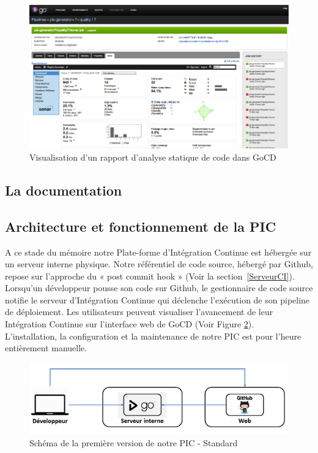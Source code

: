      \begin{figure}
        \begin{center}
          \includegraphics[scale=0.7]{images/GoCDSonar.png}
        \end{center}
        \caption{Visualisation d'un rapport d'analyse statique de code dans GoCD}
        \label{GoCDSonar}
      \end{figure}

      \subsection{La documentation}

      \subsection{Architecture et fonctionnement de la PIC}
      A ce stade du mémoire notre Plate-forme d'Intégration Continue est hébergée sur un serveur interne physique. Notre référentiel de code source, hébergé par Github, repose sur l'approche du « post commit hook » (Voir la section~\ref{ServeurCI}). Lorsqu'un développeur pousse son code sur Github, le gestionnaire de code source notifie le serveur d'Intégration Continue qui déclenche l'exécution de son pipeline de déploiement. Les utilisateurs peuvent visualiser l'avancement de leur Intégration Continue sur l'interface web de GoCD (Voir Figure \ref{PICv1}).\\

      L'installation, la configuration et la maintenance de notre PIC est pour l'heure entièrement manuelle.\\

      \begin{figure}
        \begin{center}
          \includegraphics[scale=0.5]{images/PICv1.png}
        \end{center}
        \caption{Schéma de la première version de notre PIC - Standard}
        \label{PICv1}
      \end{figure}

